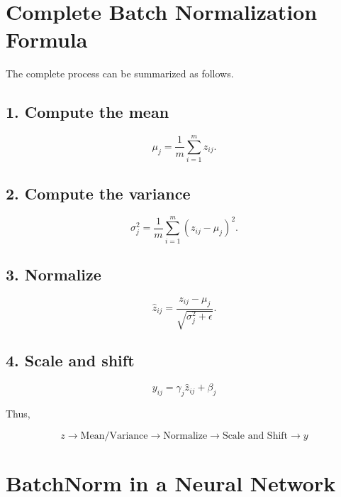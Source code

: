 \documentclass[11pt,a4paper]{article}
\begin{document}
	\section{Complete Batch Normalization Formula}
	
	The complete process can be summarized as follows.
	
	\subsection*{1. Compute the mean}
	
	\begin{equation}
		\mu_j =
		\frac{1}{m}\sum_{i=1}^{m}z_{ij}.
	\end{equation}
	
	\subsection*{2. Compute the variance}
	
	\begin{equation}
		\sigma_j^2 =
		\frac{1}{m}
		\sum_{i=1}^{m}(z_{ij}-\mu_j)^2.
	\end{equation}
	
	\subsection*{3. Normalize}
	
	\begin{equation}
		\hat{z}_{ij}
		=
		\frac{z_{ij}-\mu_j}
		{\sqrt{\sigma_j^2+\epsilon}}.
	\end{equation}
	
	\subsection*{4. Scale and shift}
	
	\begin{equation}
		\boxed{
			y_{ij}=\gamma_j\hat{z}_{ij}+\beta_j
		}
	\end{equation}
	
	Thus,
	
	\begin{equation}
		\boxed{
			z
			\longrightarrow
			\text{Mean/Variance}
			\longrightarrow
			\text{Normalize}
			\longrightarrow
			\text{Scale and Shift}
			\longrightarrow
			y
		}
	\end{equation}
	
	\section{BatchNorm in a Neural Network}
	
\end{document}
